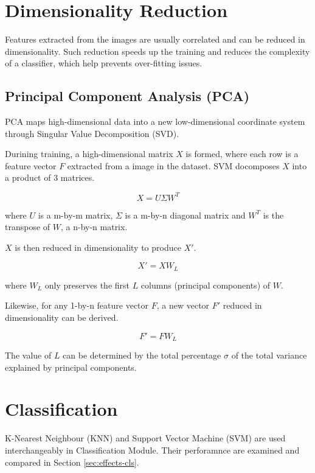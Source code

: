 \section{Dimensionality Reduction}
Features extracted from the images are usually correlated and can be reduced in dimensionality.
Such reduction speeds up the training and reduces the complexity of a classifier, which help prevents over-fitting issues.

\subsection{Principal Component Analysis (PCA)}
PCA maps high-dimensional data into a new low-dimensional coordinate system through Singular Value Decomposition (SVD).

Durining training, a high-dimensional matrix $X$ is formed, where each row is a feature vector $F$ extracted from a image in the dataset.
SVM docomposes $X$ into a product of $3$ matrices.

\begin{equation}
X = U \Sigma W^T
\end{equation}

where $U$ is a m-by-m matrix, $\Sigma$ is a m-by-n diagonal matrix and $W^T$ is the transpose of $W$, a n-by-n matrix.

$X$ is then reduced in dimensionality to produce $X'$.

\begin{equation}
X' = X W_L
\end{equation}

where $W_L$ only preserves the first $L$ columns (principal components) of $W$.

Likewise, for any 1-by-n feature vector $F$, a new vector $F'$ reduced in dimensionality can be derived.

\begin{equation}
F' = F W_L
\end{equation}

The value of $L$ can be determined by the total percentage $\sigma$ of the total variance explained by principal components.

\section{Classification}
K-Nearest Neighbour (KNN) and Support Vector Machine (SVM) are used interchangeably in Classification Module. Their perforamnce are examined and compared in Section \ref{sec:effects-cls}.

